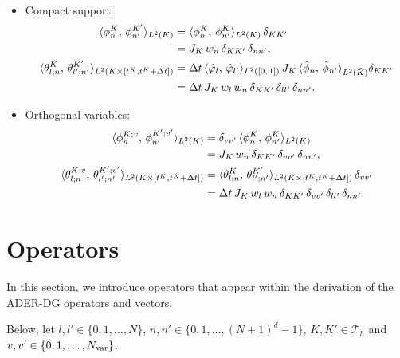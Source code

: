 \documentclass{scrreprt}
\theoremstyle{definition}
\theoremstyle{nonumberplain}
\newcommand{\tria}{\mathcal{T}_h}
\newcommand{\cell}{K}
\newcommand{\refCell}{\hat{\cell}}
\newcommand{\detJ}{J_\cell}
\begin{document}
\begin{itemize}
\begin{align}
\end{align}
\item Compact support:
\begin{align}
\langle \phi^{\cell}_{n},\,\phi^{\cell'}_{n'}\rangle_{L^2(\cell)}
&=
\langle \phi^{\cell}_{n},\,\phi^{\cell}_{n'}\rangle_{L^2(\cell)}
\,\delta_{\cell\cell'}
\notag
\\
&=
\detJ\,
w_{n}\,
\delta_{\cell\cell'}\,
\delta_{n n'},
\\
\langle\theta^{\cell}_{l;n},\,\theta^{\cell'}_{l';n'}\rangle
_{L^2(\cell\times[t^\cell,t^\cell+\Delta t])}
&=
\Delta t\,
\langle \hat{\varphi}_{l},\,\hat{\varphi}_{l'}\rangle_{L^2([0,\,1])}
\,
\detJ\,
\langle \hat{\phi}_{n},\,\hat{\phi}_{n'}\rangle_{L^2(\refCell)}
\delta_{\cell\cell'}
\notag
\\
&=
\Delta t\,\detJ\,w_{l}\,w_{n}\,
\delta_{\cell\cell'}\,\delta_{l l'}\,\delta_{n n'}.
\end{align}
\item Orthogonal variables:
\begin{align}
\label{eq:ader_impl:basis:orthogonal_variables}
\langle \phi^{\cell;v}_{n},\,\phi^{\cell';v'}_{n'}\rangle_{L^2(\cell)}
&=
\delta_{vv'}\,\langle \phi^{\cell}_{n},\,\phi^{\cell}_{n'}\rangle_{L^2(\cell)}
\notag
\\
&=
\detJ\,
w_{n}\,
\delta_{\cell\cell'}\,
\delta_{vv'}\,
\delta_{n n'},
\\
\label{eq:ader_impl:basis:orthogonal_variables_spacetime}
\langle\theta^{\cell;v}_{l;n},\,\theta^{\cell';v'}_{l';n'}\rangle
_{L^2(\cell\times[t^\cell,t^\cell+\Delta t])}
&=
\langle\theta^{\cell}_{l;n},\,\theta^{\cell'}_{l';n'}\rangle
_{L^2(\cell\times[t^\cell,t^\cell+\Delta t])}\,
\delta_{vv'}
\notag
\\
&= \Delta t\,\detJ\,w_{l}\,w_{n}\,
\delta_{\cell\cell'}\,\delta_{vv'}\,\delta_{l l'}\,\delta_{n n'}.
\end{align}
\end{itemize}
\section{Operators}
In this section, we introduce operators that appear
within the derivation of the ADER-DG
operators and vectors.

Below, let $l,l'\in\{0,1,\ldots,N\}$,
$n,n'\in\{0,1,\ldots,(N+1)^d-1\}$,
$\cell,\cell'\in\tria$ and $v,v'\in\{0,1,\ldots,N_\textup{var}\}$.
\end{document}
